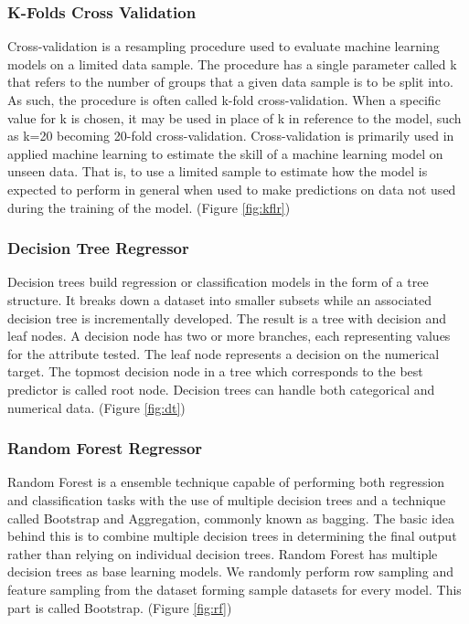 \documentclass[conference]{IEEEtran}
\begin{document}
\subsubsection{K-Folds Cross Validation}
Cross-validation is a resampling procedure used to evaluate machine learning models on a limited data sample.
The procedure has a single parameter called k that refers to the number of groups that a given data sample is to be split into. As such, the procedure is often called k-fold cross-validation.
When a specific value for k is chosen, it may be used in place of k in reference to the model, such as k=20 becoming 20-fold cross-validation.
Cross-validation is primarily used in applied machine learning to estimate the skill of a machine learning model on unseen data.
That is, to use a limited sample to estimate how the model is expected to perform in general when used to make predictions on data not used during the training of the model.
(Figure \ref{fig:kflr})

\subsubsection{Decision Tree Regressor}
Decision trees build regression or classification models in the form of a tree structure.
It breaks down a dataset into smaller subsets while an associated decision tree is incrementally developed.
The result is a tree with decision and leaf nodes.
A decision node has two or more branches, each representing values for the attribute tested.
The leaf node represents a decision on the numerical target.
The topmost decision node in a tree which corresponds to the best predictor is called root node.
Decision trees can handle both categorical and numerical data.
(Figure \ref{fig:dt})

\subsubsection{Random Forest Regressor}
Random Forest is a ensemble technique capable of performing both regression and classification tasks with the use of multiple decision trees and a technique called Bootstrap and Aggregation, commonly known as bagging.
The basic idea behind this is to combine multiple decision trees in determining the final output rather than relying on individual decision trees.
Random Forest has multiple decision trees as base learning models.
We randomly perform row sampling and feature sampling from the dataset forming sample datasets for every model.
This part is called Bootstrap.
(Figure \ref{fig:rf})
\end{document}
